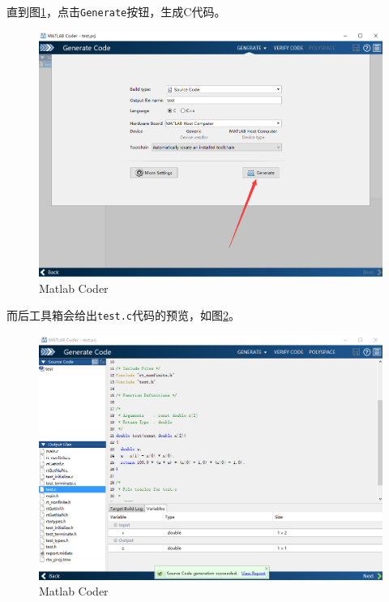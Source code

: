 \documentclass[]{ctexbook}
\begin{document}
直到图\ref{fig:coder6}，点击\texttt{Generate}按钮，生成C代码。

\begin{figure}

{\centering \includegraphics[width=0.95\linewidth]{img/coder6} 

}

\caption{Matlab Coder}\label{fig:coder6}
\end{figure}

而后工具箱会给出\texttt{test.c}代码的预览，如图\ref{fig:coder7}。

\begin{figure}

{\centering \includegraphics[width=0.95\linewidth]{img/coder7} 

}

\caption{Matlab Coder}\label{fig:coder7}
\end{figure}
\end{document}
